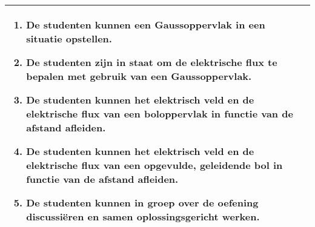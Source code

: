 \begin{landscape}
\begin{tabularx}{1.56\textwidth}{|p{}|X|}
\begin{enumerate}
			\item De studenten kunnen een Gaussoppervlak in een situatie opstellen.
			\item De studenten zijn in staat om de elektrische flux te bepalen met gebruik van een Gaussoppervlak.
			\item De studenten kunnen het elektrisch veld en de elektrische flux van een boloppervlak in functie van de afstand afleiden.
			\item De studenten kunnen het elektrisch veld en de elektrische flux van een opgevulde, geleidende bol in functie van de afstand afleiden.
		    \item De studenten kunnen in groep over de oefening discussiëren en samen oplossingsgericht werken.
		\end{enumerate} \\\hline
	\end{tabularx}



\end{landscape}
